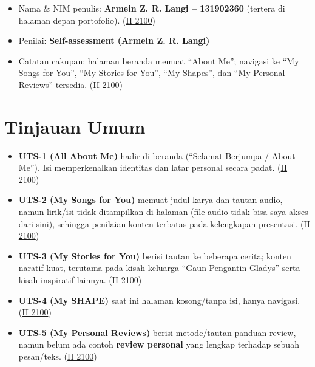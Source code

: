 \documentclass[
  letterpaper,
  DIV=11,
  numbers=noendperiod]{scrreprt}
\providecommand{\tightlist}{%
  \setlength{\itemsep}{0pt}\setlength{\parskip}{0pt}}
\begin{document}
\begin{itemize}
\tightlist
\item
  Nama \& NIM penulis: \textbf{Armein Z. R. Langi -- 131902360} (tertera
  di halaman depan portofolio).
  (\href{https://ii-2100.github.io/all-about-me/}{II 2100})
\item
  Penilai: \textbf{Self-assessment (Armein Z. R. Langi)}
\item
  Catatan cakupan: halaman beranda memuat ``About Me''; navigasi ke ``My
  Songs for You'', ``My Stories for You'', ``My Shapes'', dan ``My
  Personal Reviews'' tersedia.
  (\href{https://ii-2100.github.io/all-about-me/}{II 2100})
\end{itemize}

\section{Tinjauan Umum}\label{tinjauan-umum}

\begin{itemize}
\tightlist
\item
  \textbf{UTS-1 (All About Me)} hadir di beranda (``Selamat Berjumpa /
  About Me''). Isi memperkenalkan identitas dan latar personal secara
  padat. (\href{https://ii-2100.github.io/all-about-me/}{II 2100})
\item
  \textbf{UTS-2 (My Songs for You)} memuat judul karya dan tautan audio,
  namun lirik/isi tidak ditampilkan di halaman (file audio tidak bisa
  saya akses dari sini), sehingga penilaian konten terbatas pada
  kelengkapan presentasi.
  (\href{https://ii-2100.github.io/all-about-me/My_Song_for_You/index.html}{II
  2100})
\item
  \textbf{UTS-3 (My Stories for You)} berisi tautan ke beberapa cerita;
  konten naratif kuat, terutama pada kisah keluarga ``Gaun Pengantin
  Gladys'' serta kisah inspiratif lainnya.
  (\href{https://ii-2100.github.io/all-about-me/My_Stories_for_You/index.html}{II
  2100})
\item
  \textbf{UTS-4 (My SHAPE)} saat ini halaman kosong/tanpa isi, hanya
  navigasi.
  (\href{https://ii-2100.github.io/all-about-me/My_Shapes/index.html}{II
  2100})
\item
  \textbf{UTS-5 (My Personal Reviews)} berisi metode/tautan panduan
  review, namun belum ada contoh \textbf{review personal} yang lengkap
  terhadap sebuah pesan/teks.
  (\href{https://ii-2100.github.io/all-about-me/My_Personal_Reviews/index.html}{II
  2100})
\end{itemize}
\end{document}
